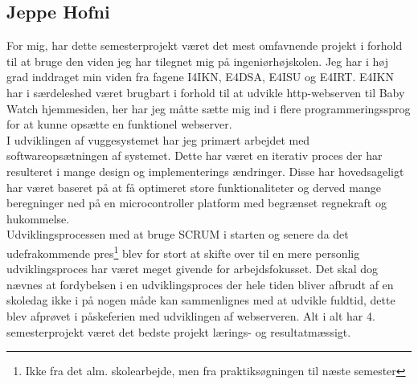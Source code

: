 \subsection*{Jeppe Hofni}
For mig, har dette semesterprojekt været det mest omfavnende projekt i forhold til at bruge den viden jeg har tilegnet mig på ingeniørhøjskolen. Jeg har i høj grad inddraget min viden fra fagene I4IKN, E4DSA, E4ISU og E4IRT. E4IKN har i særdeleshed været brugbart i forhold til at udvikle http-webserven til Baby Watch hjemmesiden, her har jeg måtte sætte mig ind i flere programmeringssprog for at kunne opsætte en funktionel webserver.\\
I udviklingen af vuggesystemet har jeg primært arbejdet med softwareopsætningen af systemet. Dette har været en iterativ proces der har resulteret i mange design og implementerings ændringer. Disse har hovedsageligt har været baseret på at få optimeret store funktionaliteter og derved mange beregninger ned på en microcontroller platform med begrænset regnekraft og hukommelse.\\
Udviklingsprocessen med at bruge SCRUM i starten og senere da det udefrakommende pres\footnote{Ikke fra det alm. skolearbejde, men fra praktiksøgningen til næste semester} blev for stort at skifte over til en mere personlig udviklingsproces har været meget givende for arbejdsfokusset. Det skal dog nævnes at fordybelsen i en udviklingsproces der hele tiden bliver afbrudt af en skoledag ikke i på nogen måde kan sammenlignes med at udvikle fuldtid, dette blev afprøvet i påskeferien med udviklingen af webserveren. Alt i alt har 4. semesterprojekt været det bedste projekt lærings- og resultatmæssigt.

